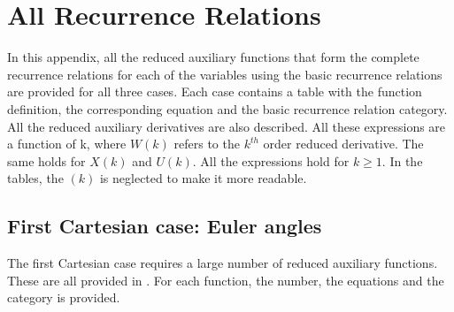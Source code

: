 \chapter{All Recurrence Relations}
\label{app:appendixD-allRecurrenceRelations}
In this appendix, all the reduced auxiliary functions that form the complete recurrence relations for each of the variables using the basic recurrence relations are provided for all three cases. Each case contains a table with the function definition, the corresponding equation and the basic recurrence relation category. All the reduced auxiliary derivatives are also described. All these expressions are a function of k, where $W\left(k\right)$ refers to the $k^{th}$ order reduced derivative. The same holds for $X\left(k\right)$ and $U\left(k\right)$. All the expressions hold for $k\geq1$. In the tables, the $\left(k\right)$ is neglected to make it more readable.

\section{First Cartesian case: Euler angles}
\label{sec:firCartApp}
The first Cartesian case requires a large number of reduced auxiliary functions. These are all provided in . For each function, the number, the equations and the category is provided.



